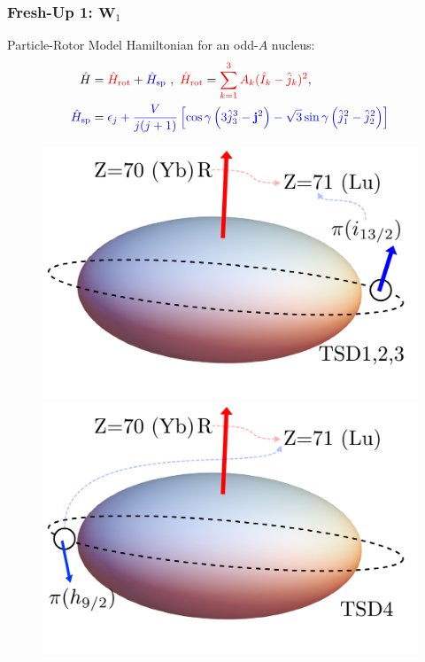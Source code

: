\documentclass{beamer}
\begin{document}
\begin{frame}
	\frametitle{Fresh-Up 1: $\mathbf{W}_1$}
	Particle-Rotor Model Hamiltonian for an odd-$A$ nucleus:	
	\begin{alignat*}{2}
		\hat{H}&={\color{red}\hat{H}_\text{rot}}+{\color{blue}\hat{H}_\text{sp}}\ ,\ {\color{red}\hat{H}_\text{rot}}={\color{red}\sum_{k=1}^3A_k(\hat{I}_k-\hat{j}_k)^2},\\
		{\color{blue}\hat{H}_\text{sp}}&={\color{blue}\epsilon_j+\frac{V}{j(j+1)}\left[\cos\gamma\left(3\hat{j}_3^3-\mathbf{j}^2\right)-\sqrt{3}\sin\gamma\left(\hat{j}_1^2-\hat{j}_2^2\right)\right]}
	\end{alignat*}
	\vspace{-0.4cm}
	\begin{figure}
		\centering
		\includegraphics[scale=0.22]{figures/triaxial-shapes-oddA-1.pdf}
		\includegraphics[scale=0.22]{figures/triaxial-shapes-oddA-2.pdf}

\end{figure}
\end{frame}
\end{document}

